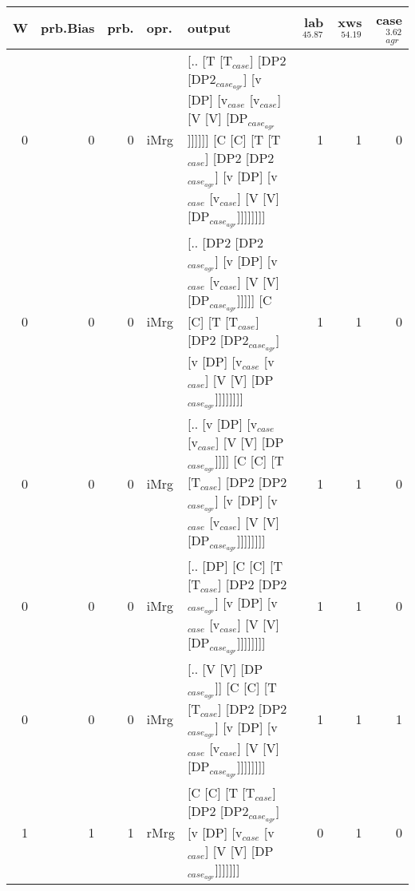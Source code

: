 \begin{tabularx}{\linewidth}{rrrlXrrr}
\hline
   W &   prb.Bias &   prb. & opr.   & output                                                                                                                                                                             &   lab$^{45.87}$ &   xws$^{54.19}$ &   case$_{agr}^{3.62}$ \\
\hline
   0 &       0 &   0 & iMrg & [.. [T [T$_{case}$] [DP2 [DP2$_{case_{agr}}$] [v [DP] [v$_{case}$ [v$_{case}$] [V [V] [DP$_{case_{agr}}$]]]]]] [C [C] [T [T$_{case}$] [DP2 [DP2$_{case_{agr}}$] [v [DP] [v$_{case}$ [v$_{case}$] [V [V] [DP$_{case_{agr}}$]]]]]]]] &             1 &             1 &                  0 \\
   0 &       0 &   0 & iMrg & [.. [DP2 [DP2$_{case_{agr}}$] [v [DP] [v$_{case}$ [v$_{case}$] [V [V] [DP$_{case_{agr}}$]]]]] [C [C] [T [T$_{case}$] [DP2 [DP2$_{case_{agr}}$] [v [DP] [v$_{case}$ [v$_{case}$] [V [V] [DP$_{case_{agr}}$]]]]]]]]              &             1 &             1 &                  0 \\
   0 &       0 &   0 & iMrg & [.. [v [DP] [v$_{case}$ [v$_{case}$] [V [V] [DP$_{case_{agr}}$]]]] [C [C] [T [T$_{case}$] [DP2 [DP2$_{case_{agr}}$] [v [DP] [v$_{case}$ [v$_{case}$] [V [V] [DP$_{case_{agr}}$]]]]]]]]                                   &             1 &             1 &                  0 \\
   0 &       0 &   0 & iMrg & [.. [DP] [C [C] [T [T$_{case}$] [DP2 [DP2$_{case_{agr}}$] [v [DP] [v$_{case}$ [v$_{case}$] [V [V] [DP$_{case_{agr}}$]]]]]]]]                                                                               &             1 &             1 &                  0 \\
   0 &       0 &   0 & iMrg & [.. [V [V] [DP$_{case_{agr}}$]] [C [C] [T [T$_{case}$] [DP2 [DP2$_{case_{agr}}$] [v [DP] [v$_{case}$ [v$_{case}$] [V [V] [DP$_{case_{agr}}$]]]]]]]]                                                              &             1 &             1 &                  1 \\
   1 &       1 &   1 & rMrg & [C [C] [T [T$_{case}$] [DP2 [DP2$_{case_{agr}}$] [v [DP] [v$_{case}$ [v$_{case}$] [V [V] [DP$_{case_{agr}}$]]]]]]]                                                                                         &             0 &             1 &                  0 \\
\hline
\end{tabularx}\endgroup\\

